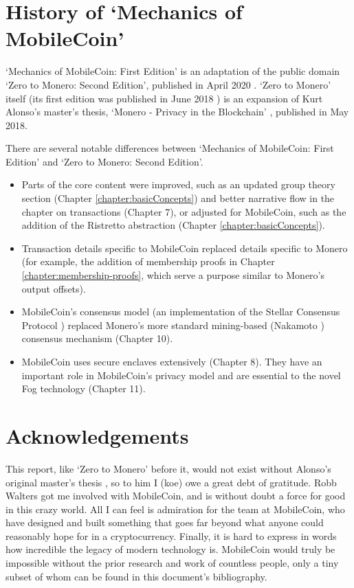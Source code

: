 \section{History of `Mechanics of MobileCoin'}

`Mechanics of MobileCoin: First Edition' is an adaptation of the public domain `Zero to Monero: Second Edition', published in April 2020 \cite{ztm-2}. `Zero to Monero' itself (its first edition was published in June 2018 \cite{ztm-1}) is an expansion of Kurt Alonso's master's thesis, `Monero - Privacy in the Blockchain' \cite{kurt-original}, published in May 2018.

There are several notable differences between `Mechanics of MobileCoin: First Edition' and `Zero to Monero: Second Edition'.

\begin{itemize}
    \item Parts of the core content were improved, such as an updated group theory section (Chapter \ref{chapter:basicConcepts}) and better narrative flow in the chapter on transactions (Chapter 7), or adjusted for MobileCoin, such as the addition of the Ristretto abstraction (Chapter \ref{chapter:basicConcepts}).
    \item Transaction details specific to MobileCoin replaced details specific to Monero (for example, the addition of membership proofs in Chapter \ref{chapter:membership-proofs}, which serve a purpose similar to Monero's output offsets).
    \item MobileCoin's consensus model (an implementation of the Stellar Consensus Protocol \cite{stellar-consensus-protocol}) replaced Monero's more standard mining-based (Nakamoto \cite{Nakamoto_bitcoin}) consensus mechanism (Chapter 10).
    \item MobileCoin uses secure enclaves extensively (Chapter 8). They have an important role in MobileCoin's privacy model and are essential to the novel Fog technology (Chapter 11).%
\end{itemize}



\section{Acknowledgements}
\label{sec:acknowledgements}


This report, like `Zero to Monero' before it, would not exist without Alonso's original master's thesis \cite{kurt-original}, so to him I (koe) owe a great debt of gratitude. Robb Walters got me involved with MobileCoin, and is without doubt a force for good in this crazy world. All I can feel is admiration for the team at MobileCoin, who have designed and built something that goes far beyond what anyone could reasonably hope for in a cryptocurrency. Finally, it is hard to express in words how incredible the legacy of modern technology is. MobileCoin would truly be impossible without the prior research and work of countless people, only a tiny subset of whom can be found in this document's bibliography.